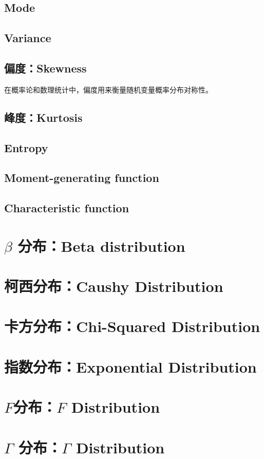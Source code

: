\documentclass[11pt]{book}
\newcounter{#2}
\newcounter{#2}[#1]
\numberwithin{#2}{#1}
\begin{document}
			\subsection{Mode}
			\subsection{Variance}
			\subsection{偏度：Skewness}
				在概率论和数理统计中，偏度用来衡量随机变量概率分布对称性。
			\subsection{峰度：Kurtosis}
			\subsection{Entropy}
			\subsection{Moment-generating function}
			\subsection{Characteristic function}
			
		
		\section{$ \beta $ 分布：Beta distribution}
		\section{柯西分布：Caushy Distribution}
		\section{卡方分布：Chi-Squared Distribution}
		\section{指数分布：Exponential Distribution}
		\section{$ F $分布：$ F $ Distribution}
		\section{$ \Gamma $ 分布：$ \Gamma $ Distribution}
\end{document}
